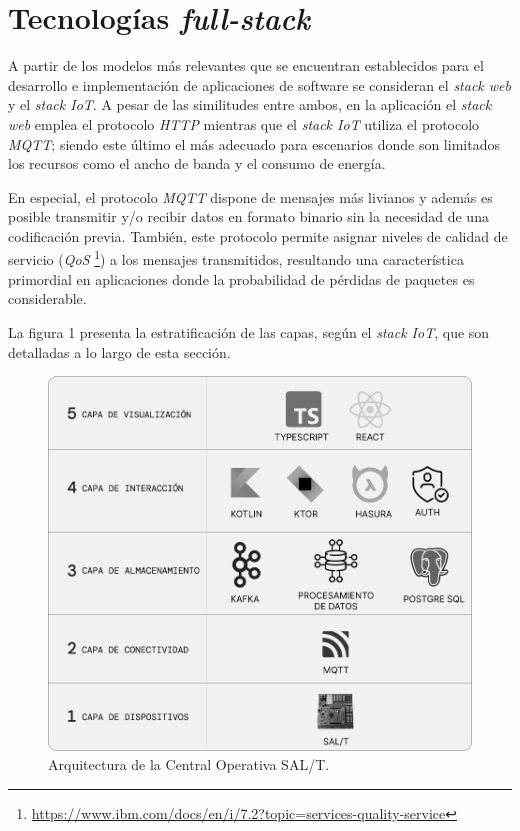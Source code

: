 \section{Tecnologías \textit{full-stack}}

A partir de los modelos más relevantes que se encuentran establecidos para el desarrollo e implementación de aplicaciones de software se consideran el \textit{stack web} y el \textit{stack IoT}. A pesar de las similitudes entre ambos, en la aplicación el \textit{stack web} emplea el protocolo \textit{HTTP} mientras que el \textit{stack IoT} utiliza el protocolo \textit{MQTT}; siendo este último el más adecuado para escenarios donde son limitados los recursos como el ancho de banda y el consumo de energía.

En especial, el protocolo \textit{MQTT} dispone de mensajes más livianos y además es posible transmitir y/o recibir datos en formato binario sin la necesidad de una codificación previa. También, este protocolo permite asignar niveles de calidad de servicio (\textit{QoS} \footnote{\url{https://www.ibm.com/docs/en/i/7.2?topic=services-quality-service}}) a los mensajes transmitidos, resultando una característica primordial en aplicaciones donde la probabilidad de pérdidas de paquetes es considerable.

La figura 1 presenta la estratificación de las capas, según el \textit{stack IoT}, que son detalladas a lo largo de esta sección.

\begin{figure}[htpb]
  \centering 
  \includegraphics[width=.75\textwidth]{Figures/cuadro.jpg}
  \caption{Arquitectura de la Central Operativa SAL/T.}
  \label{fig:diagBloques}
\end{figure}


